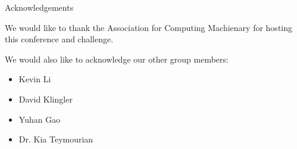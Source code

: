 \documentclass[9pt]{beamer}
\begin{document}
\begin{frame}[fragile]{ Acknowledgements }


    We would like to thank the Association for Computing Machienary for hosting this conference and challenge.
    
    We would also like to acknowledge our other group members: 
    \begin{itemize}
        \item Kevin Li
        \item David Klingler
        \item Yuhan Gao
        \item Dr. Kia Teymourian
    \end{itemize}



    
\end{frame}



    

\end{document}
